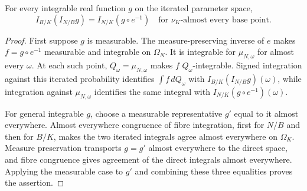 \begin{lemma}\label{lem:algebraic-tower-signed}
\leanok
{}
For every integrable real function $g$ on the iterated parameter
space,
\[
 I_{B/K}(I_{N/B}g)=I_{N/K}(g\circ e^{-1})
 \quad\text{for }\nu_K\text{-almost every base point}.
\]
\end{lemma}
\begin{proof}
First suppose $g$ is measurable. The measure-preserving inverse of
$e$ makes $f=g\circ e^{-1}$ measurable and integrable on $\Omega_N$.
It is integrable for $\mu_{N,\omega}$ for almost every $\omega$.
At each such point, $Q_\omega=\mu_{N,\omega}$ makes $f$
$Q_\omega$-integrable. Signed integration against this iterated
probability identifies $\int f\,dQ_\omega$ with
$I_{B/K}(I_{N/B}g)(\omega)$, while integration against
$\mu_{N,\omega}$ identifies the same integral with
$I_{N/K}(g\circ e^{-1})(\omega)$.

For general integrable $g$, choose a measurable representative $g'$
equal to it almost everywhere. Almost everywhere congruence of fibre
integration, first for $N/B$ and then for $B/K$, makes the two
iterated integrals agree almost everywhere on $\Omega_K$.
Measure preservation transports $g=g'$ almost everywhere to the
direct space, and fibre congruence gives agreement of the direct
integrals almost everywhere. Applying the measurable case to $g'$
and combining these three equalities proves the assertion.
\end{proof}

